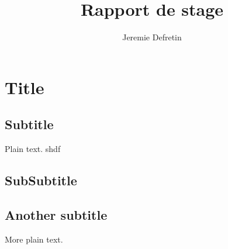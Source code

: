 \documentclass{article}
\title{Rapport de stage}
\author{Jeremie Defretin}
\begin{document}
\maketitle

\section{Title}

\subsection{Subtitle}

Plain text. shdf

\subsection{SubSubtitle}


\subsection{Another subtitle}

More plain text.
\end{document}
